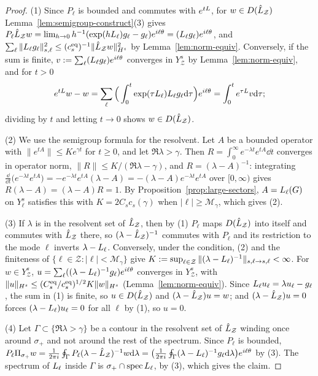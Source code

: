 \begin{proof}
(1) Since $P_\ell$ is bounded and commutes with $e^{tL}$, for
$w\in D(\hat{L}_{\mathcal Z})$ Lemma~\ref{lem:semigroup-construct}(3) gives
$P_\ell\hat{L}_{\mathcal Z} w=\lim_{h\to0}h^{-1}(\exp(hL_{\ell})g_\ell-g_\ell)e^{i\ell\theta}
=(L_{\ell}g_\ell)e^{i\ell\theta}$, and
$\sum_\ell\|L_{\ell}g_\ell\|^2_{s,\ell}\le(c^{\rm eq}_s)^{-1}\|\hat{L}_{\mathcal Z} w\|^2_{H^s}$ by
Lemma~\ref{lem:norm-equiv}. Conversely, if the sum is finite,
$v:=\sum_\ell(L_{\ell}g_\ell)e^{i\ell\theta}$ converges in $Y^s_{\mathcal Z}$ by
Lemma~\ref{lem:norm-equiv}, and for $t>0$
\[
e^{tL}w-w=\sum_\ell\Big(\int_0^t\exp(\tau L_{\ell})L_{\ell}g_\ell\dd\tau\Big)e^{i\ell\theta}
=\int_0^te^{\tau L}v\dd\tau;
\]
dividing by $t$ and letting $t\to0$ shows $w\in D(\hat{L}_{\mathcal Z})$.

(2) We use the semigroup formula for the resolvent. Let $A$ be a bounded operator
with $\|e^{tA}\|\le Ke^{\gamma t}$ for $t\ge0$, and let $\Re\lambda>\gamma$. Then
$R=\int_0^\infty e^{-\lambda t}e^{tA}\dd t$ converges in operator norm,
$\|R\|\le K/(\Re\lambda-\gamma)$, and $R=(\lambda-A)^{-1}$: integrating
$\frac{\dd}{\dd t}\big(e^{-\lambda t}e^{tA}\big)=-e^{-\lambda t}e^{tA}(\lambda-A)
=-(\lambda-A)e^{-\lambda t}e^{tA}$ over $[0,\infty)$ gives $R(\lambda-A)=(\lambda-A)R=1$.
By Proposition~\ref{prop:large-sectors}, $A=L_{\ell}(G)$ on $Y^s_\ell$ satisfies this
with $K=2C_sc_s(\gamma)$ when $|\ell|\ge\mathcal M_\gamma$, which gives (2).

(3) If $\lambda$ is in the resolvent set of $\hat{L}_{\mathcal Z}$, then by (1) $P_\ell$ maps
$D(\hat{L}_{\mathcal Z})$ into itself and commutes with $\hat{L}_{\mathcal Z}$ there, so
$(\lambda-\hat{L}_{\mathcal Z})^{-1}$ commutes with $P_\ell$ and its restriction to the mode
$\ell$ inverts $\lambda-L_{\ell}$. Conversely, under the condition, (2) and the
finiteness of $\{\ell\in\mathcal Z:|\ell|<\mathcal M_\gamma\}$ give
$K:=\sup_{\ell\in\mathcal Z}\|(\lambda-L_{\ell})^{-1}\|_{s,\ell\to s,\ell}<\infty$.
For $w\in Y^s_{\mathcal Z}$, $u=\sum_\ell((\lambda-L_{\ell})^{-1}g_\ell)e^{i\ell\theta}$
converges in $Y^s_{\mathcal Z}$, with
$\|u\|_{H^s}\le(C^{\rm eq}_s/c^{\rm eq}_s)^{1/2}K\|w\|_{H^s}$
(Lemma~\ref{lem:norm-equiv}). Since $L_{\ell}u_\ell=\lambda u_\ell-g_\ell$, the sum in
(1) is finite, so $u\in D(\hat{L}_{\mathcal Z})$ and $(\lambda-\hat{L}_{\mathcal Z})u=w$; and
$(\lambda-\hat{L}_{\mathcal Z})u=0$ forces $(\lambda-L_{\ell})u_\ell=0$ for all $\ell$ by (1),
so $u=0$.

(4) Let $\Gamma\subset\{\Re\lambda>\gamma\}$ be a contour in the resolvent set of
$\hat{L}_{\mathcal Z}$ winding once around $\sigma_+$ and not around the rest of the spectrum.
Since $P_\ell$ is bounded,
$P_\ell\Pi_{\sigma_+}w=\frac1{2\pi i}\oint_\Gamma P_\ell(\lambda-\hat{L}_{\mathcal Z})^{-1}w\dd\lambda
=\big(\frac1{2\pi i}\oint_\Gamma(\lambda-L_{\ell})^{-1}g_\ell\dd\lambda\big)e^{i\ell\theta}$
by (3). The spectrum of $L_{\ell}$ inside $\Gamma$ is
$\sigma_+\cap\operatorname{spec}L_{\ell}$, by (3), which gives the claim.
\end{proof}

